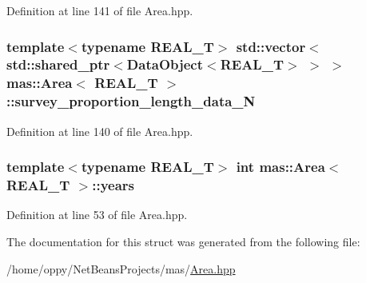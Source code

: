 Definition at line 141 of file Area.\-hpp.

\hypertarget{structmas_1_1_area_a33b8c87411a6eb87d89faf910a6e33d1}{
\subsubsection[{survey\-\_\-proportion\-\_\-length\-\_\-data\-\_\-\-N}]{\setlength{\rightskip}{0pt plus 5cm}template$<$typename R\-E\-A\-L\-\_\-\-T$>$ std\-::vector$<$std\-::shared\-\_\-ptr$<${\bf Data\-Object}$<$R\-E\-A\-L\-\_\-\-T$>$ $>$ $>$ {\bf mas\-::\-Area}$<$ R\-E\-A\-L\-\_\-\-T $>$\-::survey\-\_\-proportion\-\_\-length\-\_\-data\-\_\-\-N}}\label{structmas_1_1_area_a33b8c87411a6eb87d89faf910a6e33d1}


Definition at line 140 of file Area.\-hpp.

\hypertarget{structmas_1_1_area_a2a4e96c3f8817d242c50655f341083c0}{
\subsubsection[{years}]{\setlength{\rightskip}{0pt plus 5cm}template$<$typename R\-E\-A\-L\-\_\-\-T$>$ int {\bf mas\-::\-Area}$<$ R\-E\-A\-L\-\_\-\-T $>$\-::years}}\label{structmas_1_1_area_a2a4e96c3f8817d242c50655f341083c0}


Definition at line 53 of file Area.\-hpp.



The documentation for this struct was generated from the following file\-:\begin{DoxyCompactItemize}
\item 
/home/oppy/\-Net\-Beans\-Projects/mas/\hyperlink{_area_8hpp}{Area.\-hpp}\end{DoxyCompactItemize}
